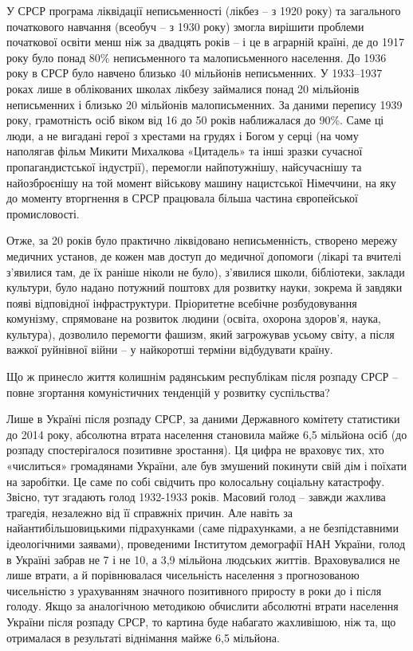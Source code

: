 \documentclass[12pt,a4paper,openany]{book}
\begin{document}
У СРСР програма ліквідації неписьменності (лікбез – з 1920 року) та загального початкового навчання (всеобуч – з 1930 року) змогла вирішити проблеми початкової освіти менш ніж за двадцять років – і це в аграрній країні, де до 1917 року було понад 80\% неписьменного та малописьменного населення. До 1936 року в СРСР було навчено близько 40 мільйонів неписьменних. У 1933–1937 роках лише в облікованих школах лікбезу займалися понад 20 мільйонів неписьменних і близько 20 мільйонів малописьменних. За даними перепису 1939 року, грамотність осіб віком від 16 до 50 років наближалася до 90\%. Саме ці люди, а не вигадані герої з хрестами на грудях і Богом у серці (на чому наполягав фільм Микити Михалкова «Цитадель» та інші зразки сучасної пропагандистської індустрії), перемогли найпотужнішу, найсучаснішу та найозброєнішу на той момент військову машину нацистської Німеччини, на яку до моменту вторгнення в СРСР працювала більша частина європейської промисловості.

Отже, за 20 років було практично ліквідовано неписьменність, створено мережу медичних установ, де кожен мав доступ до медичної допомоги (лікарі та вчителі з’явилися там, де їх раніше ніколи не було), з’явилися школи, бібліотеки, заклади культури, було надано потужний поштовх для розвитку науки, зокрема й завдяки появі відповідної інфраструктури. Пріоритетне всебічне розбудовування комунізму, спрямоване на розвиток людини (освіта, охорона здоров’я, наука, культура), дозволило перемогти фашизм, який загрожував усьому світу, а після важкої руйнівної війни – у найкоротші терміни відбудувати країну.

Що ж принесло життя колишнім радянським республікам після розпаду СРСР – повне згортання комуністичних тенденцій у розвитку суспільства?

Лише в Україні після розпаду СРСР, за даними Державного комітету статистики до 2014 року, абсолютна втрата населення становила майже 6,5 мільйона осіб (до розпаду спостерігалося позитивне зростання). Ця цифра не враховує тих, хто «числиться» громадянами України, але був змушений покинути свій дім і поїхати на заробітки. Це саме по собі свідчить про колосальну соціальну катастрофу. Звісно, тут згадають голод 1932-1933 років. Масовий голод – завжди жахлива трагедія, незалежно від її справжніх причин. Але навіть за найантибільшовицькими підрахунками (саме підрахунками, а не безпідставними ідеологічними заявами), проведеними Інститутом демографії НАН України, голод в Україні забрав не 7 і не 10, а 3,9 мільйона людських життів. Враховувалися не лише втрати, а й порівнювалася чисельність населення з прогнозованою чисельністю з урахуванням значного позитивного приросту в роки до і після голоду. Якщо за аналогічною методикою обчислити абсолютні втрати населення України після розпаду СРСР, то картина буде набагато жахливішою, ніж та, що отрималася в результаті віднімання майже 6,5 мільйона.
\end{document}
